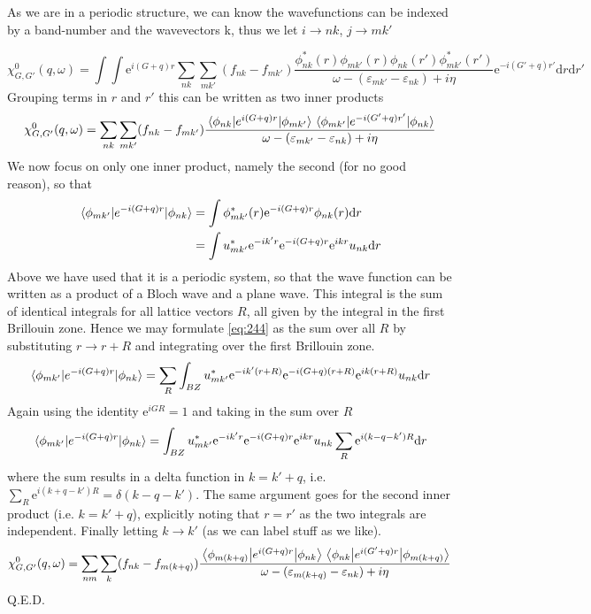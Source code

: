 \begin{solution}
As we are in a periodic structure, we can know the wavefunctions can be indexed by a band-number and the wavevectors k, thus we let $i \rightarrow nk$, $j \rightarrow mk'$

{\small
\begin{equation}
    \chi_{G,G'}^{0}(q,\omega) = \int \int \mathrm{e}^{i(G+q)r} \sum_{nk}\sum_{mk'}(f_{nk}-f_{mk'})\dfrac{\phi_{nk}^{*}(r)\phi_{mk'}(r)\phi_{nk}(r')\phi_{mk'}^{*}(r')}{\omega - (\varepsilon_{mk'}-\varepsilon_{nk})+i\eta}\mathrm{e}^{-i(G'+q)r'}\mathrm{d}r\mathrm{d}r'
\end{equation}}
Grouping terms in $r$ and $r'$ this can be written as two inner products
\begin{equation}
    \chi_{G,G'}^{0}(q,\omega) = \sum_{nk} \sum_{mk'} (f_{nk}-f_{mk'}) \frac{\mel{\phi_{nk}}{e^{i(G+q)r}}{\phi_{mk'}}\mel{\phi_{mk'}}{e^{-i(G'+q)r'}}{\phi_{nk}}}{\omega - (\varepsilon_{mk'}-\varepsilon_{nk})+i\eta}
\end{equation}
We now focus on only one inner product, namely the second (for no good reason), so that
\begin{align}
    \mel{\phi_{mk'}}{e^{-i(G+q)r}}{\phi_{nk}} &= \int \phi_{mk'}^{*}(r) \mathrm{e}^{-i(G+q)r}\phi_{nk}(r) \mathrm{d}r\\
    & =\int u_{mk'}^{*}\mathrm{e}^{-ik'r} \mathrm{e}^{-i(G+q)r}\mathrm{e}^{ikr}u_{nk} \mathrm{d}r \label{eq:244}
\end{align}
Above we have used that it is a periodic system, so that the wave function can be written as a product of a Bloch wave and a plane wave. 
This integral is the sum of identical integrals for all lattice vectors $R$, all given by  the integral in the first Brillouin zone. Hence we may formulate \eqref{eq:244} as the sum over all $R$ by substituting $r \rightarrow r + R$ and integrating over the first Brillouin zone.
\begin{equation}
    \mel{\phi_{mk'}}{e^{-i(G+q)r}}{\phi_{nk}} = \sum_R \int_{BZ} u_{mk'}^{*}\mathrm{e}^{-ik'(r+R)} \mathrm{e}^{-i(G+q)(r+R)}\mathrm{e}^{ik(r+R)}u_{nk} \mathrm{d}r
\end{equation}
Again using the identity $\mathrm{e}^{iGR} = 1$ and taking in the sum over $R$
\begin{equation}
    \mel{\phi_{mk'}}{e^{-i(G+q)r}}{\phi_{nk}} =  \int_{BZ} u_{mk'}^{*}\mathrm{e}^{-ik'r} \mathrm{e}^{-i(G+q)r}\mathrm{e}^{ikr}u_{nk} \sum_R \mathrm{e}^{i(k - q -k')R} \mathrm{d}r
\end{equation}
where the sum results in a delta function in $k = k' + q$, i.e. $\sum_R \mathrm{e}^{i(k + q -k')R} = \delta(k-q-k')$. The same argument goes for the second inner product (i.e. $k = k' + q$), explicitly noting that $r = r'$ as the two integrals are independent. Finally letting $k \rightarrow k'$ (as we can label stuff as we like).
\begin{equation}
       \chi_{G,G'}^{0}(q,\omega) = \sum_{nm} \sum_{k} (f_{nk}-f_{m(k+q)}) \frac{\mel{\phi_{m(k+q)}}{e^{i(G+q)r}}{\phi_{nk}}\mel{\phi_{nk}}{e^{i(G'+q)r}}{\phi_{m(k+q)}}}{\omega - (\varepsilon_{m(k+q)}-\varepsilon_{nk})+i\eta} 
       \label{eq:247}
\end{equation}
Q.E.D.


\end{solution}
